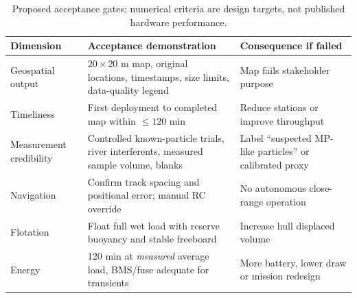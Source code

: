 \documentclass[10pt,a4paper]{article}
\begin{document}
\begin{table}[H]\centering\footnotesize
\caption{Proposed acceptance gates; numerical criteria are design targets, not published hardware performance.}
\begin{tabularx}{\linewidth}{@{}L{3.1cm}Y Y@{}}\toprule
Dimension & Acceptance demonstration & Consequence if failed\\\midrule
Geospatial output & $20\times20$ m map, original locations, timestamps, size limits, data-quality legend & Map fails stakeholder purpose\\
Timeliness & First deployment to completed map within $\leq120$ min & Reduce stations or improve throughput\\
Measurement credibility & Controlled known-particle trials, river interferents, measured sample volume, blanks & Label ``suspected MP-like particles'' or calibrated proxy\\
Navigation & Confirm track spacing and positional error; manual RC override & No autonomous close-range operation\\
Flotation & Float full wet load with reserve buoyancy and stable freeboard & Increase hull displaced volume\\
Energy & 120 min at \emph{measured} average load, BMS/fuse adequate for transients & More battery, lower draw or mission redesign\\\bottomrule\end{tabularx}\end{table}
\end{document}
